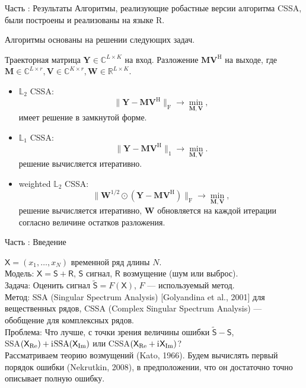 \documentclass[10pt, ucs, notheorems, handout]{beamer}
\newcommand{\tX}[1]{\mathsf{#1}}
\newcommand{\iu}{\mathrm{i}\mkern1mu}
\newcommand{\RomanNumeralCaps}[1]
{\MakeUppercase{\romannumeral #1}}
\begin{document}
\begin{frame}{Часть \RomanNumeralCaps{1}: Результаты}
	Алгоритмы, реализующие робастные версии алгоритма CSSA, были построены и реализованы на языке R.

	\vspace{1em}
Алгоритмы основаны на решении следующих задач.

	Траекторная матрица $\mathbf{Y} \in \mathbb{C}^{L\times K}$ на вход.
    Разложение $\mathbf{M}\mathbf{V}^{\mathrm{H}}$ на выходе,
	где $\mathbf{M} \in \mathbb{C}^{L\times r}, \mathbf{V} \in \mathbb{C}^{K\times r}, \mathbf{W} \in \mathbb{R}^{L\times K}$.\\
	\vspace{1em}
	\begin{itemize}
		\item $\mathbb{L}_2$ CSSA:
		$$ \|\mathbf{Y}-\mathbf{M}\mathbf{V}^{\mathrm{H}}\|_\mathrm{F} \longrightarrow \min_{\mathbf{M},\mathbf{V}},$$
		имеет решение в замкнутой форме.
		\item $\mathbb{L}_1$ CSSA:
		$$\|\mathbf{Y}-\mathbf{M}\mathbf{V}^{\mathrm{H}}\|_1 \longrightarrow \min_{\mathbf{M},\mathbf{V}}.$$
		решение вычисляется итеративно.
		\item weighted $\mathbb{L}_2$ CSSA:
		$$\|\mathbf{W}^{1/2}\odot(\mathbf{Y}-\mathbf{M}\mathbf{V}^{\mathrm{H}})\|_\mathrm{F} \longrightarrow \min_{\mathbf{M},\mathbf{V}},$$
		решение вычисляется итеративно, $\mathbf{W}$ обновляется на каждой итерации согласно величине остатков разложения.
	\end{itemize}

\end{frame}

\begin{frame}{Часть \RomanNumeralCaps{2}: Введение}
	
	$\tX{X} = (x_1, \ldots, x_{N})$ временной ряд длины $N$.\\
	\vspace{1em}
	\alert{Модель:} $\tX{X} = \tX{S} + \tX{R}$, $\tX{S}$ сигнал, $\tX{R}$ возмущение (шум или выброс).\\
	\vspace{1em}
	\alert{Задача:} Оценить сигнал $\tilde{\tX{S}} = F(\tX{X})$, $F$ --- используемый метод.\\
	\vspace{1em}
	\alert{Метод:} SSA (Singular Spectrum Analysis) [Golyandina et al., 2001] для вещественных рядов, CSSA (Complex Singular Spectrum Analysis) --- обобщение для комплексных рядов.\\
	\vspace{1em}
	\alert{Проблема:} Что лучше, с точки зрения величины ошибки $\tilde{\tX{S}} - \tX{S}$,\\
	SSA$(\tX{X}_{\Re}) + \iu \text{SSA}(\tX{X}_{\Im})$ или CSSA$(\tX{X}_{\Re} + \iu \tX{X}_{\Im})$?\\
	\vspace{1em}
	Рассматриваем теорию возмущений (Kato, 1966). Будем вычислять первый порядок ошибки (Nekrutkin, 2008), в предположении, что он достаточно точно описывает полную ошибку.
\end{frame}
\end{document}
